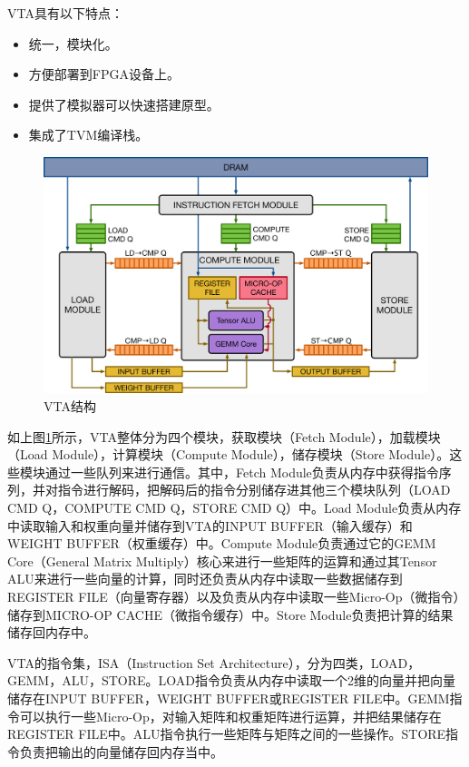 VTA具有以下特点：
\begin{itemize}
    \item {统一，模块化。}
    \item {方便部署到FPGA设备上。}
    \item {提供了模拟器可以快速搭建原型。}
    \item {集成了TVM编译栈。}
\end{itemize}

\begin{figure}[h!]
    \centering
    \includegraphics[width=270bp]{figure/vta_overview.png}
    \caption{VTA结构}
    \label{vta}
\end{figure}

如上图\ref{vta}所示，VTA整体分为四个模块，获取模块（Fetch Module），加载模块（Load Module），计算模块（Compute Module），储存模块（Store Module）。这些模块通过一些队列来进行通信。其中，Fetch Module负责从内存中获得指令序列，并对指令进行解码，把解码后的指令分别储存进其他三个模块队列（LOAD CMD Q，COMPUTE CMD Q，STORE CMD Q）中。Load Module负责从内存中读取输入和权重向量并储存到VTA的INPUT BUFFER（输入缓存）和WEIGHT BUFFER（权重缓存）中。Compute Module负责通过它的GEMM Core（General Matrix Multiply）核心来进行一些矩阵的运算和通过其Tensor ALU来进行一些向量的计算，同时还负责从内存中读取一些数据储存到REGISTER FILE（向量寄存器）以及负责从内存中读取一些Micro-Op（微指令）储存到MICRO-OP CACHE（微指令缓存）中。Store Module负责把计算的结果储存回内存中。

VTA的指令集，ISA（Instruction Set Architecture），分为四类，LOAD，GEMM，ALU，STORE。LOAD指令负责从内存中读取一个2维的向量并把向量储存在INPUT BUFFER，WEIGHT BUFFER或REGISTER FILE中。GEMM指令可以执行一些Micro-Op，对输入矩阵和权重矩阵进行运算，并把结果储存在REGISTER FILE中。ALU指令执行一些矩阵与矩阵之间的一些操作。STORE指令负责把输出的向量储存回内存当中。
